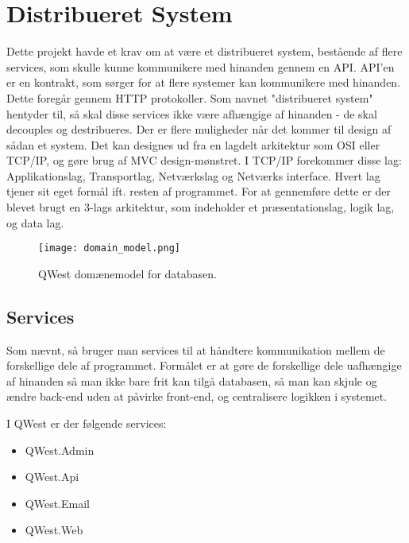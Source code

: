 \section{Distribueret System}\label{sec:distSys}
Dette projekt havde et krav om at være et distribueret system, bestående af flere services, som skulle kunne kommunikere med hinanden gennem en API. API'en er en kontrakt, som sørger for at flere systemer kan kommunikere med hinanden\cite{API}. Dette foregår gennem HTTP protokoller\cite{http}. 
Som navnet "distribueret system" hentyder til, så skal disse services ikke være afhængige af hinanden - de skal decouples\cite{decoupling} og destribueres. Der er flere muligheder når det kommer til design af sådan et system. Det kan designes ud fra en lagdelt arkitektur som OSI eller TCP/IP\cite{osi_tcp}, og gøre brug af MVC design-mønstret. I TCP/IP forekommer disse lag: Applikationslag, Transportlag, Netværkslag og Netværks interface. 
Hvert lag tjener sit eget formål ift. resten af programmet. 
For at gennemføre dette er der blevet brugt en 3-lags arkitektur, som indeholder et præsentationslag, logik lag, og data lag. 

\begin{figure}
    \texttt{[image: domain\_model.png]}
    \caption{QWest domænemodel for databasen.}
    \label{fig:domain_model}
\end{figure}

\subsection{Services}\label{sec:servicesArc}
Som nævnt, så bruger man services til at håndtere kommunikation mellem de forskellige dele af programmet. Formålet er at gøre de forskellige dele uafhængige af hinanden så man ikke bare frit kan tilgå databasen, så man kan skjule og ændre back-end uden at påvirke front-end, og centralisere logikken i systemet. 

I QWest er der følgende services:
\begin{itemize}\label{services}
    \item QWest.Admin
    \item QWest.Api
    \item QWest.Email
    \item QWest.Web
\end{itemize}

